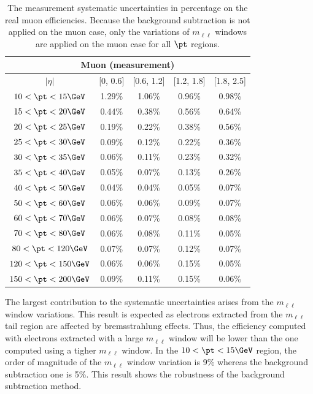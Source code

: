 \begin{table}[htbp]
\begin{center}
\begin{tabular}{ccccc}
\hline
\hline
\multicolumn{5}{c}{Muon (measurement)}\\
\hline
$|\eta|$ & [0, 0.6] & [0.6, 1.2] & [1.2, 1.8] & [1.8, 2.5]\\
\hline
$10<\pt<15 \GeV$ & 1.29\% & 1.06\% & 0.96\% & 0.98\%\\
$15<\pt<20 \GeV$ & 0.44\% & 0.38\% & 0.56\% & 0.64\%\\
$20<\pt<25 \GeV$ & 0.19\% & 0.22\% & 0.38\% & 0.56\%\\
$25<\pt<30 \GeV$ & 0.09\% & 0.12\% & 0.22\% & 0.36\%\\
$30<\pt<35 \GeV$ & 0.06\% & 0.11\% & 0.23\% & 0.32\%\\
$35<\pt<40 \GeV$ & 0.05\% & 0.07\% & 0.13\% & 0.26\%\\
$40<\pt<50 \GeV$ & 0.04\% & 0.04\% & 0.05\% & 0.07\%\\
$50<\pt<60 \GeV$ & 0.06\% & 0.06\% & 0.09\% & 0.07\%\\
$60<\pt<70 \GeV$ & 0.06\% & 0.07\% & 0.08\% & 0.08\%\\
$70<\pt<80 \GeV$ & 0.06\% & 0.08\% & 0.11\% & 0.05\%\\
$80<\pt<120 \GeV$ & 0.07\% & 0.07\% & 0.12\% & 0.07\%\\
$120<\pt<150 \GeV$ & 0.06\% & 0.06\% & 0.15\% & 0.05\%\\
$150<\pt<200 \GeV$ & 0.09\% & 0.11\% & 0.15\% & 0.06\%\\
\hline
\hline
\end{tabular}
\caption{
The measurement systematic uncertainties in percentage on the real muon efficiencies.
Because the background subtraction is not applied on the muon case, only the variations of $m_{\ell\ell}$ windows are applied on the muon case for all $\pt$ regions.
}
\label{tab:RLE_bkg_systematics_muon}
\end{center}
\end{table}

The largest contribution to the systematic uncertainties arises from the $m_{\ell\ell}$ window variations.
This result is expected as electrons extracted from the $m_{\ell\ell}$ tail region are affected by bremsstrahlung effects.
Thus, the efficiency computed with electrons extracted with a large $m_{\ell\ell}$ window will be lower than the one computed using a tigher $m_{\ell\ell}$ window.
In the $10<\pt<15 \GeV$ region, the order of magnitude of the $m_{\ell\ell}$ window variation is 9\% whereas the background subtraction one is 5\%.
This result shows the robustness of the background subtraction method.



